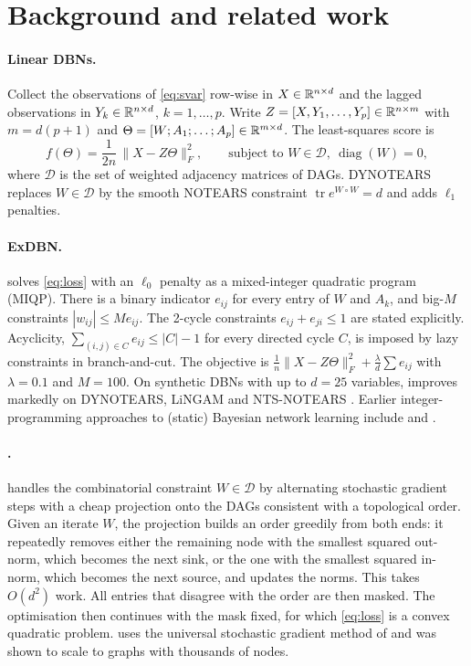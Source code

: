 \section{Background and related work}
\label{sec:background}

\paragraph{Linear DBNs.}
Collect the observations of \eqref{eq:svar} row-wise in $X\in\mathbb{R}^{n\times d}$ and the lagged
observations in $Y_k\in\mathbb{R}^{n\times d}$, $k=1,\dots,p$. Write
$Z=[X, Y_1,\dots,Y_p]\in\mathbb{R}^{n\times m}$ with $m=d(p+1)$ and
$\Theta=[W; A_1;\dots;A_p]\in\mathbb{R}^{m\times d}$. The least-squares score is
\begin{equation}
  \label{eq:loss}
  f(\Theta) = \frac{1}{2n}\,\|X - Z\Theta\|_F^2 ,
  \qquad \text{subject to } W \in \mathcal{D},\ \operatorname{diag}(W)=0,
\end{equation}
where $\mathcal{D}$ is the set of weighted adjacency matrices of DAGs. DYNOTEARS
\citep{pamfil2020dynotears} replaces $W\in\mathcal{D}$ by the smooth NOTEARS constraint
$\operatorname{tr} e^{W\circ W}=d$ and adds $\ell_1$ penalties.

\paragraph{ExDBN.}
\exdbn{} \citep{rytir2025exdbn} solves \eqref{eq:loss} with an $\ell_0$ penalty as a
mixed-integer quadratic program (MIQP). There is a binary indicator $e_{ij}$ for every entry of $W$
and $A_k$, and big-$M$ constraints $|w_{ij}|\le M e_{ij}$. The 2-cycle constraints
$e_{ij}+e_{ji}\le 1$ are stated explicitly. Acyclicity, $\sum_{(i,j)\in C} e_{ij}\le |C|-1$ for
every directed cycle $C$, is imposed by lazy constraints in branch-and-cut. The objective is
$\frac1n\|X-Z\Theta\|_F^2+\frac{\lambda}{d}\sum e_{ij}$ with $\lambda=0.1$ and $M=100$. On
synthetic DBNs with up to $d=25$ variables, \exdbn{} improves markedly on DYNOTEARS, LiNGAM
and NTS-NOTEARS \citep{rytir2025exdbn}. Earlier integer-programming approaches to (static)
Bayesian network learning include \citet{bartlett2017integer} and \citet{manzour2021integer}.

\paragraph{\psidag.}
\psidag{} \citep{ziu2024psi} handles the combinatorial constraint $W\in\mathcal{D}$ by
alternating stochastic gradient steps with a cheap projection onto the DAGs consistent with
a topological order. Given an iterate $W$, the projection builds an order greedily from both
ends: it repeatedly removes either the remaining node with the smallest squared out-norm,
which becomes the next sink, or the one with the smallest squared in-norm, which becomes the
next source, and updates the norms. This takes $O(d^2)$ work. All entries that disagree with
the order are then masked. The optimisation then continues with the mask fixed, for which
\eqref{eq:loss} is a convex quadratic problem. \psidag{} uses the universal stochastic gradient
method of \citet{rodomanov2024universal} and was shown to scale to graphs with thousands of
nodes.

